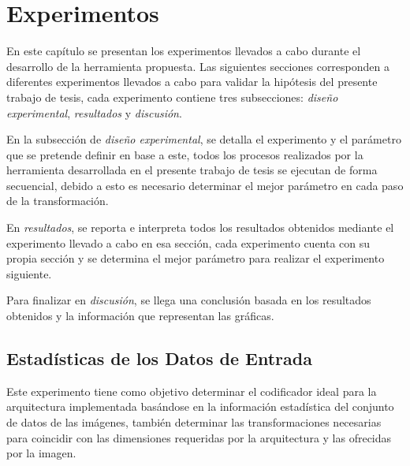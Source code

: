 \chapter{Experimentos}
En este capítulo se presentan los experimentos llevados a cabo durante el desarrollo de la herramienta propuesta. Las siguientes secciones corresponden a diferentes experimentos llevados a cabo para validar la hipótesis del presente trabajo de tesis, cada experimento contiene tres subsecciones: \emph{diseño experimental}, \emph{resultados} y \emph{discusión}.

En la subsección de \emph{diseño experimental}, se detalla el experimento y el parámetro que se pretende definir en base a este, todos los procesos realizados por la herramienta desarrollada en el presente trabajo de tesis se ejecutan de forma secuencial, debido a esto es necesario determinar el mejor parámetro en cada paso de la transformación.

En \emph{resultados}, se reporta e interpreta todos los resultados obtenidos mediante el experimento llevado a cabo en esa sección, cada experimento cuenta con su propia sección y se determina el mejor parámetro para realizar el experimento siguiente. 

Para finalizar en \emph{discusión}, se llega una conclusión basada en los resultados obtenidos y la información que representan las gráficas.


\section{Estadísticas de los Datos de Entrada} 
Este experimento tiene como objetivo determinar el codificador ideal para la arquitectura implementada basándose en la información estadística del conjunto de datos de las imágenes, también determinar las transformaciones necesarias para coincidir con las dimensiones requeridas por la arquitectura y las ofrecidas por la imagen.

